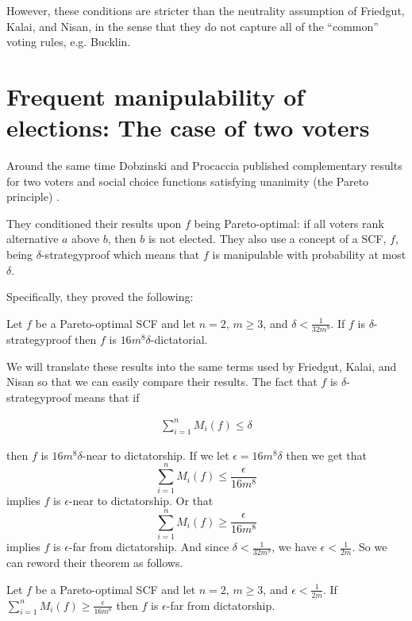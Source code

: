 	However, these conditions are stricter than the neutrality assumption of Friedgut, Kalai, and Nisan, in the sense that they do not capture all of the ``common'' voting rules, e.g. Bucklin.


\section{Frequent manipulability of elections: The case of two voters}

	Around the same time Dobzinski and Procaccia published complementary results for two voters and social choice functions satisfying unanimity (the Pareto principle) \cite{dobzinski2008frequent}.

    They conditioned their results upon $f$ being Pareto-optimal: if all voters rank alternative $a$ above $b$, then $b$ is not elected. They also use a concept of a SCF, $f$, being $\delta$-strategyproof which means that $f$ is manipulable with probability at most $\delta$.

    Specifically, they proved the following:

	\begin{theorem}
		Let $f$ be a Pareto-optimal SCF and let $n = 2$, $m \ge 3$, and $\delta < \frac{1}{32m^9}$. If $f$ is $\delta$-strategyproof then $f$ is $16m^8 \delta$-dictatorial.
	\end{theorem}

	We will translate these results into the same terms used by Friedgut, Kalai, and Nisan so that we can easily compare their results. The fact that $f$ is $\delta$-strategyproof means that if

	\begin{align*}
		\sum_{i=1}^n M_i(f) \le \delta
	\end{align*}

	then $f$ is $16m^8 \delta$-near to dictatorship. If we let $\epsilon = 16m^8 \delta$ then we get that
	\[
		\sum_{i=1}^n M_i(f) \le \frac{\epsilon}{16m^8}
	\]
	implies $f$ is $\epsilon$-near to dictatorship. Or that
	\[
		\sum_{i=1}^n M_i(f) \ge \frac{\epsilon}{16m^8}
	\]
	implies $f$ is $\epsilon$-far from dictatorship. And since $\delta < \frac{1}{32m^9}$, we have $\epsilon < \frac{1}{2m}$. So we can reword their theorem as follows.

	\begin{theorem}
		Let $f$ be a Pareto-optimal SCF and let $n = 2$, $m \ge 3$, and $\epsilon < \frac{1}{2m}$. If $\sum_{i=1}^n M_i(f) \ge \frac{\epsilon}{16m^8}$ then $f$ is $\epsilon$-far from dictatorship.
	\end{theorem}

